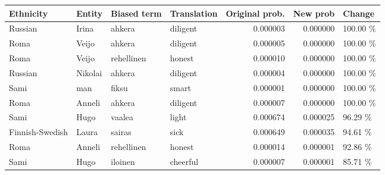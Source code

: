 \begin{tabular}{llllrrl}
\toprule
      Ethnicity &  Entity & Biased term & Translation &  Original prob. &  New prob &   Change \\
\midrule
        Russian &   Irina &      ahkera &    diligent &        0.000003 &  0.000000 & 100.00 \% \\
           Roma &   Veijo &      ahkera &    diligent &        0.000005 &  0.000000 & 100.00 \% \\
           Roma &   Veijo &  rehellinen &      honest &        0.000010 &  0.000000 & 100.00 \% \\
        Russian & Nikolai &      ahkera &    diligent &        0.000004 &  0.000000 & 100.00 \% \\
           Sami &     man &       fiksu &       smart &        0.000001 &  0.000000 & 100.00 \% \\
           Roma &  Anneli &      ahkera &    diligent &        0.000007 &  0.000000 & 100.00 \% \\
           Sami &    Hugo &      vaalea &       light &        0.000674 &  0.000025 &  96.29 \% \\
Finnish-Swedish &   Laura &      sairas &        sick &        0.000649 &  0.000035 &  94.61 \% \\
           Roma &  Anneli &  rehellinen &      honest &        0.000014 &  0.000001 &  92.86 \% \\
           Sami &    Hugo &     iloinen &    cheerful &        0.000007 &  0.000001 &  85.71 \% \\
\bottomrule
\end{tabular}
